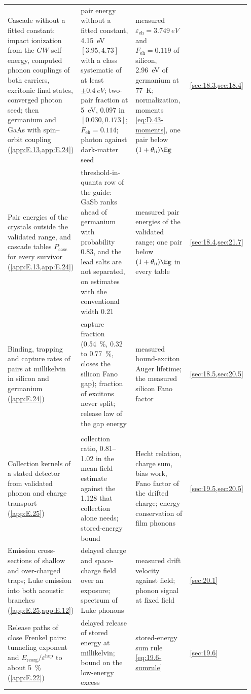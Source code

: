 {\begin{longtable}{@{}>{\raggedright\arraybackslash}p{0.25\linewidth}>{\raggedright\arraybackslash}p{0.305\linewidth}>{\raggedright\arraybackslash}p{0.305\linewidth}>{\raggedright\arraybackslash}p{0.09\linewidth}@{}}
  Cascade without a fitted constant: impact ionization from the $GW$ self-energy, computed phonon couplings of both carriers, excitonic final states, converged photon seed; then germanium and GaAs with spin--orbit coupling (\cref{app:E.13,app:E.24}) & pair energy without a fitted constant, \SI{4.15}{eV} $[3.95, 4.73]$ with a class systematic of at least $\pm\SI{0.4}{eV}$; two-pair fraction at \SI{5}{eV}, 0.097 in $[0.030, 0.173]$; $F_{\mathrm{eh}} = 0.114$; photon against dark-matter seed & measured $\varepsilon_{\mathrm{eh}} = \SI{3.749}{eV}$ and $F_{\mathrm{eh}} = 0.119$ of silicon, \SI{2.96}{eV} of germanium at \SI{77}{K}; normalization, moments \cref{eq:D.43-moments}, one pair below $(1 + \theta_{\mathrm{ii}})\Eg$ & \cref{sec:18.3,sec:18.4} \\
  Pair energies of the crystals outside the validated range, and cascade tables $P_{\mathrm{casc}}$ for every survivor (\cref{app:E.13,app:E.24}) & threshold-in-quanta row of the guide: GaSb ranks ahead of germanium with probability 0.83, and the lead salts are not separated, on estimates with the conventional width 0.21 & measured pair energies of the validated range; one pair below $(1 + \theta_{\mathrm{ii}})\Eg$ in every table & \cref{sec:18.4,sec:21.7} \\
  Binding, trapping and capture rates of pairs at millikelvin in silicon and germanium (\cref{app:E.24}) & capture fraction (\SI{0.54}{\percent}, 0.32 to \SI{0.77}{\percent}, closes the silicon Fano gap); fraction of excitons never split; release law of the gap energy & measured bound-exciton Auger lifetime; the measured silicon Fano factor & \cref{sec:18.5,sec:20.5} \\
  \midrule
  \multicolumn{4}{@{}l}{\emph{Readout and delayed signals}} \\
  Collection kernels of a stated detector from validated phonon and charge transport (\cref{app:E.25}) & collection ratio, 0.81--1.02 in the mean-field estimate against the 1.128 that collection alone needs; stored-energy bound & Hecht relation, charge sum, bias work, Fano factor of the drifted charge; energy conservation of film phonons & \cref{sec:19.5,sec:20.5} \\
  Emission cross-sections of shallow and over-charged traps; Luke emission into both acoustic branches (\cref{app:E.25,app:E.12}) & delayed charge and space-charge field over an exposure; spectrum of Luke phonons & measured drift velocity against field; phonon signal at fixed field & \cref{sec:20.1} \\
  Release paths of close Frenkel pairs: tunneling exponent and $E_{\mathrm{reorg}}/\varepsilon^{\mathrm{hop}}$ to about \SI{5}{\percent} (\cref{app:E.22}) & delayed release of stored energy at millikelvin; bound on the low-energy excess & stored-energy sum rule \cref{eq:19.6-sumrule} & \cref{sec:19.6} \\

\end{longtable}}
